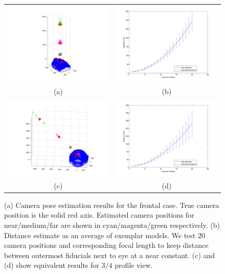 \documentclass[runningheads]{llncs}
\begin{document}
\begin{figure}[ht]
\begin{tabular}{cc}
\includegraphics[width=.45\linewidth]{resources/figures/cameraloc_frontal.png} &
\includegraphics[width=.45\linewidth]{resources/figures/errorbar_frontal.png} \\
(a) & (b) \\
\includegraphics[width=.45\linewidth]{resources/figures/cameraloc_3q.png} &
\includegraphics[width=.45\linewidth]{resources/figures/errorbar_3q.png} \\
(c) & (d)
\end{tabular}
\caption{
(a) Camera pose estimation results for the frontal case.  
True camera position is the solid red axis.  
Estimated camera positions for near/medium/far are shown in cyan/magenta/green respectively.   
(b) Distance estimate as an average of exemplar models.  
We test $20$ camera positions and corresponding focal length to keep distance between outermost fiducials next to eye at a near constant. 
(c) and (d) show equivalent results for $3/4$ profile view.}
\label{fig:results}
\end{figure}
\end{document}
